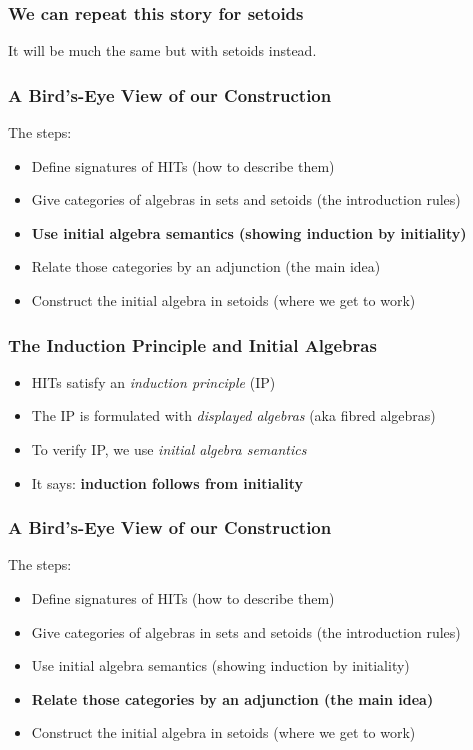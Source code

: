 \documentclass{beamer}
\begin{document}
\begin{frame}
\frametitle{We can repeat this story for setoids}
It will be much the same but with setoids instead.
\end{frame}

\begin{frame}
\frametitle{A Bird's-Eye View of our Construction}
The steps:
\begin{itemize}
	\item Define signatures of HITs (how to describe them)
	\item Give categories of algebras in sets and setoids (the introduction rules)
	\item \textbf{Use initial algebra semantics (showing induction by initiality)}
	\item Relate those categories by an adjunction (the main idea)
	\item Construct the initial algebra in setoids (where we get to work)
\end{itemize}
\end{frame}

\begin{frame}
\frametitle{The Induction Principle and Initial Algebras}
\begin{itemize}
	\item HITs satisfy an \emph{induction principle} (IP)
	\item The IP is formulated with \emph{displayed algebras} (aka fibred algebras)
	\item To verify IP, we use \emph{initial algebra semantics}
	\item It says: \textbf{induction follows from initiality}
\end{itemize}
\end{frame}

\begin{frame}
\frametitle{A Bird's-Eye View of our Construction}
The steps:
\begin{itemize}
	\item Define signatures of HITs (how to describe them)
	\item Give categories of algebras in sets and setoids (the introduction rules)
	\item Use initial algebra semantics (showing induction by initiality)
	\item \textbf{Relate those categories by an adjunction (the main idea)}
	\item Construct the initial algebra in setoids (where we get to work)
\end{itemize}
\end{frame}
\end{document}
